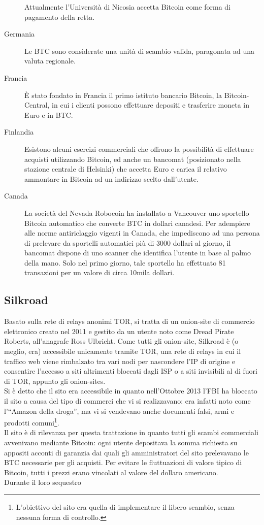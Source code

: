 \begin{description}
 Attualmente l'Università di Nicosia accetta Bitcoin come forma di pagamento della retta.
 \item[Germania] Le BTC sono considerate una unità di scambio valida, paragonata ad una valuta regionale.
 \item[Francia] È stato fondato in Francia il primo istituto bancario Bitcoin, la Bitcoin-Central, in cui i clienti possono effettuare depositi e trasferire moneta in Euro e in BTC.
 \item[Finlandia] Esistono alcuni esercizi commerciali che offrono la possibilità di effettuare acquisti utilizzando Bitcoin, ed anche un bancomat (posizionato nella stazione centrale di Helsinki) che accetta Euro e carica il relativo ammontare in Bitcoin ad un indirizzo scelto dall'utente.
 \item[Canada] La società del Nevada Robocoin ha installato a Vancouver uno sportello Bitcoin automatico che converte BTC in dollari canadesi. Per adempiere alle norme antiriclaggio vigenti in Canada, che impediscono ad una persona di prelevare da sportelli automatici più di 3000 dollari al giorno, il bancomat dispone di uno scanner che identifica l'utente in base al palmo della mano. Solo nel primo giorno, tale sportello ha effettuato 81 transazioni per un valore di circa 10mila dollari.
\end{description}

\subsection{Silkroad}\label{silkroad}

Basato sulla rete di relays anonimi TOR, si tratta di un onion-site di commercio elettronico creato nel 2011 e gestito da un utente noto come Dread Pirate Roberts, all'anagrafe Ross Ulbricht. Come tutti gli onion-site, Silkroad è (o meglio, era) accessibile unicamente tramite TOR, una rete di relays in cui il traffico web viene rimbalzato tra vari nodi per nascondere l'IP di origine e consentire l'accesso a siti altrimenti bloccati dagli ISP o a siti invisibili al di fuori di TOR, appunto gli onion-sites.\\
Si è detto che il sito era accessibile in quanto nell'Ottobre 2013 l'FBI ha bloccato il sito a causa del tipo di commerci che vi si realizzavano: era infatti noto come l'``Amazon della droga'', ma vi si vendevano anche documenti falsi, armi e prodotti comuni\footnote{L'obiettivo del sito era quella di implementare il libero scambio, senza nessuna forma di controllo.}.\\
Il sito è di rilevanza per questa trattazione in quanto tutti gli scambi commerciali avvenivano mediante Bitcoin: ogni utente depositava la somma richiesta su appositi acconti di garanzia dai quali gli amministratori del sito prelevavano le BTC necessarie per gli acquisti. Per evitare le fluttuazioni di valore tipico di Bitcoin, tutti i prezzi erano vincolati al valore del dollaro americano.\\
Durante il loro sequestro